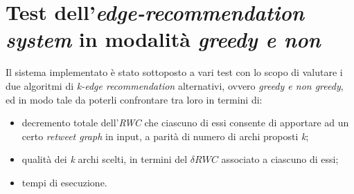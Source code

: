\chapter{Test dell’\textit{edge-recommendation system} in modalità \textit{greedy e non}}
\label{chap:test}

Il sistema implementato è stato sottoposto a vari test con lo scopo di valutare i due algoritmi di \textit{k-edge recommendation} alternativi, ovvero \textit{greedy e non greedy}, ed in modo tale da poterli confrontare tra loro in termini di:
\begin{itemize} 
\item decremento totale dell'\textit{RWC} che ciascuno di essi consente di apportare ad un certo \textit{retweet graph} in input, a parità di numero di archi proposti \textit{k};
\item qualità dei \textit{k} archi scelti, in termini del \textit{$\delta RWC$} associato a ciascuno di essi;
\item tempi di esecuzione.
\end{itemize}

